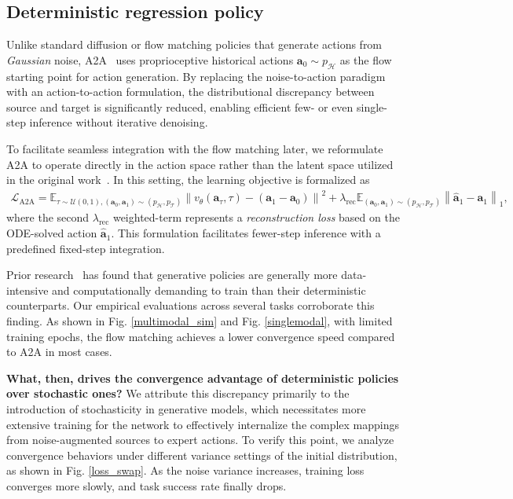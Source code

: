 \subsection{Deterministic regression policy}

Unlike standard diffusion or flow matching policies that generate actions from \textit{Gaussian} noise, A2A~\citep{jia2026action} uses proprioceptive historical actions $\mathbf{a}_{0} \sim p_\mathcal{H}$ as the flow starting point for action generation. By replacing the noise-to-action paradigm with an action-to-action formulation, the distributional discrepancy between source and target is significantly reduced, enabling efficient few- or even single-step inference without iterative denoising. 

To facilitate seamless integration with the flow matching later, we reformulate A2A to operate directly in the action space rather than the latent space utilized in the original work~\citep{jia2026action}. In this setting, the learning objective is formalized as 
\begin{equation}
\begin{aligned}
    \mathcal{L}_{\mathrm{A2A}} = \mathbb{E}_{\tau\sim \mathcal{U}(0,1), (\mathbf{a}_0, \mathbf{a}_1) \sim(p_\mathcal{H}, p_\mathcal{T})} \left\| v_\theta(\mathbf{a}_\tau, \tau) - (\mathbf{a}_1 - \mathbf{a}_0) \right\|^2 
    + \lambda_{\text{rec}} \mathbb{E}_{(\mathbf{a}_0, \mathbf{a}_1) \sim(p_\mathcal{H}, p_\mathcal{T})} \left\| \hat{\mathbf{a}}_1 - \mathbf{a}_1 \right\|_1,
    \label{eq:a2a_loss}
\end{aligned}
\end{equation}
where the second $\lambda_{\text{rec}}$ weighted-term represents a \textit{reconstruction loss} based on the ODE-solved action $\hat{\mathbf{a}}_1$. This formulation facilitates fewer-step inference with a predefined fixed-step integration.

Prior research~\citep{dp, pan2025much, jia2026action} has found that generative policies are generally more data-intensive and computationally demanding to train than their deterministic counterparts. Our empirical evaluations across several tasks corroborate this finding. As shown in Fig. \ref{multimodal_sim} and Fig. \ref{singlemodal}, with limited training epochs, the flow matching achieves a lower convergence speed compared to A2A in most cases. 


\textbf{What, then, drives the convergence advantage of deterministic policies over stochastic ones?} We attribute this discrepancy primarily to the introduction of stochasticity in generative models, which necessitates more extensive training for the network to effectively internalize the complex mappings from noise-augmented sources to expert actions. To verify this point, we analyze convergence behaviors under different variance settings of the initial distribution, as shown in Fig. \ref{loss_swap}. As the noise variance increases, training loss converges more slowly, and task success rate finally drops.

